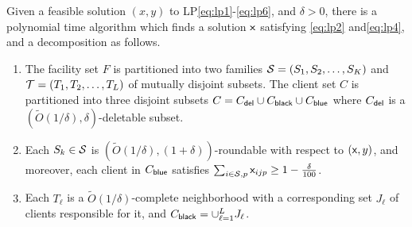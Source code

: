 \begin{theorem}\label{thm:decomp}
	Given a feasible solution $(x,y)$ to LP\eqref{eq:lp1}-\eqref{eq:lp6}, and $\delta > 0$, there is a polynomial time algorithm which finds a solution ${\mathsf x}$ satisfying \eqref{eq:lp2} and\eqref{eq:lp4}, and a
	decomposition as follows.
	\begin{enumerate}%
		\item The facility set $F$ is partitioned into two families ${\cal S} = (S_1, S_2, \ldots, S_K)$ and ${\cal T} = (T_1, T_2, \ldots, T_L)$ of mutually disjoint subsets.
		The client set $C$ is partitioned into three disjoint subsets $C = C_{\mathsf{del}} \cup C_{\mathsf{black}} \cup C_{\mathsf{blue}}$ where $C_{\mathsf{del}}$ is a $(\tilde{O}(1/\delta),\delta)$-deletable subset.
		
			\item Each $S_k \in {\cal S}$ is $(\tilde{O}(1/\delta),(1+\delta))$-roundable with respect to $({\mathsf x},y)$, and moreover, each client in $C_{\mathsf{blue}}$ satisfies $\sum_{i \in {\cal S}, p} {\mathsf x}_{ijp} \geq 1 - \frac{\delta}{100}$.
		\item Each $T_\ell$ is a $\tilde{O}(1/\delta)$-complete neighborhood with a corresponding set $J_\ell$ of clients responsible for it, and $C_{\mathsf{black}} = \cup_{\ell = 1}^L J_\ell$.	
%		
%		
%		
	\end{enumerate}
\end{theorem}


